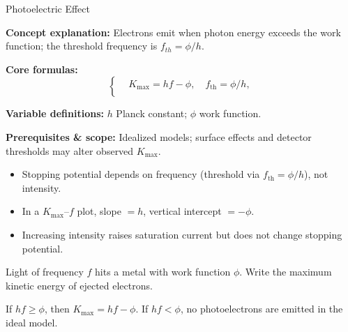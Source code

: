 \begin{KnowledgePoint}{Photoelectric Effect \Core}
  \KPFormulas
  \begin{formulabox}
  \textbf{Concept explanation:} Electrons emit when photon energy exceeds the work function; the threshold frequency is $f_{th}=\phi/h$.

  \textbf{Core formulas:}
  \[
  \left\{\begin{aligned}
    &K_{\max}=hf-\phi,\quad f_{\text{th}}=\phi/h,\\
  \end{aligned}\right.
  \]

  \textbf{Variable definitions:} $h$ Planck constant; $\phi$ work function.

  \textbf{Prerequisites \& scope:} Idealized models; surface effects and detector thresholds may alter observed $K_{\max}$.
  \end{formulabox}

  \KPHeuristics
  \begin{heuristicsbox}
  \begin{itemize}[leftmargin=*]
    \item Stopping potential depends on frequency (threshold via $f_{\text{th}}=\phi/h$), not intensity.
    \item In a $K_{\max}$--$f$ plot, slope $=h$, vertical intercept $=-\phi$.
    \item Increasing intensity raises saturation current but does not change stopping potential.
  \end{itemize}
  \end{heuristicsbox}

  \KPProblems
  \begin{cheatproblem}
  Light of frequency $f$ hits a metal with work function $\phi$. Write the maximum kinetic energy of ejected electrons.
  \begin{solutionbox}
  If $hf\ge\phi$, then $K_{\max}=hf-\phi$. If $hf<\phi$, no photoelectrons are emitted in the ideal model.
  \end{solutionbox}
  \end{cheatproblem}
\end{KnowledgePoint}

